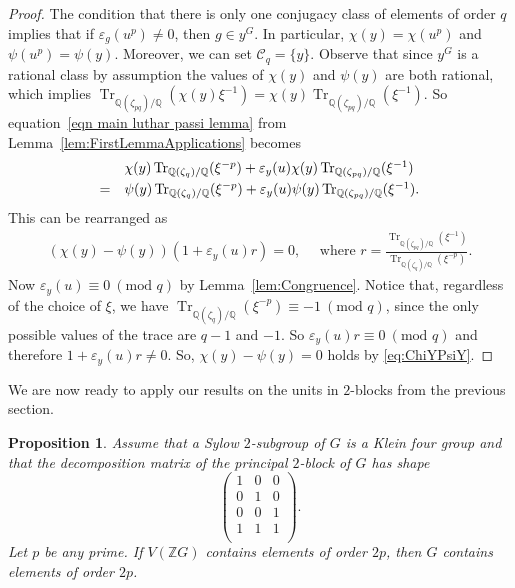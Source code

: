 \documentclass[11pt, a4paper]{amsart}
\newtheorem{proposition}[theorem]{Proposition}
\theoremstyle{definition}
\theoremstyle{definition}
\newcommand{\Tr}{\operatorname{Tr}}
\begin{document}
\begin{proof}
The condition that there is only one conjugacy class of elements of order $q$ implies that if $\varepsilon_g(u^p) \neq 0$, then $g \in y^G$. In particular, $\chi(y) = \chi(u^p)$ and $\psi(u^p) = \psi(y)$. Moreover, we can set $\mathcal{C}_q = \{y \}$. Observe that since $y^G$ is a rational class by assumption the values of $\chi(y)$ and $\psi(y)$ are both rational, which implies $\Tr_{\mathbb{Q}(\zeta_{pq})/\mathbb{Q}}(\chi(y)\xi^{-1})  = \chi(y) \Tr_{\mathbb{Q}(\zeta_{pq})/\mathbb{Q}}(\xi^{-1})$.
So equation~\eqref{eqn main luthar passi lemma}
 from Lemma~\ref{lem:FirstLemmaApplications} becomes
 \begin{equation}
 \begin{array}{rl}
 & \chi(y)\Tr_{\mathbb{Q}(\zeta_q)/\mathbb{Q}}(\xi^{-p}) + \varepsilon_y(u)\chi(y)\Tr_{\mathbb{Q}(\zeta_{pq})/\mathbb{Q}}(\xi^{-1}) \vspace*{.1cm} \\ 
 =& \psi(y)\Tr_{\mathbb{Q}(\zeta_q)/\mathbb{Q}}(\xi^{-p}) + \varepsilon_y(u)\psi(y)\Tr_{\mathbb{Q}(\zeta_{pq})/\mathbb{Q}}(\xi^{-1}) .
 \end{array} 
 \end{equation}
This can be rearranged as
\begin{align}\label{eq:ChiYPsiY}
(\chi(y) - \psi(y))(1 + \varepsilon_y(u)r) = 0,\quad  \textrm{ where } r = \frac{\Tr_{\mathbb{Q}(\zeta_{pq})/\mathbb{Q}}(\xi^{-1})}{\Tr_{\mathbb{Q}(\zeta_q)/\mathbb{Q}}(\xi^{-p})}.
\end{align}
Now $\varepsilon_y(u) \equiv 0 \ (\textrm{mod }q)$ by Lemma~\ref{lem:Congruence}. Notice that, regardless of the choice of $\xi$, we have $\Tr_{\mathbb{Q}(\zeta_q)/\mathbb{Q}}(\xi^{-p}) \equiv -1\ (\textrm{mod }q)$, since the only possible values of the trace are $q-1$ and $-1$. So $\varepsilon_y(u)r \equiv 0 \ (\textrm{mod }q)$ and therefore $1+\varepsilon_y(u)r \neq 0$. So, $\chi(y) - \psi(y) = 0$ holds by \eqref{eq:ChiYPsiY}.
\end{proof}

We are now ready to apply our results on the units in $2$-blocks from the previous section.

\begin{proposition}
Assume that a Sylow $2$-subgroup of $G$ is a Klein four group and that the decomposition matrix of the principal $2$-block of $G$ has shape
\[\begin{pmatrix} 1 & 0 & 0 \\ 0 & 1 & 0 \\ 0 & 0 & 1 \\ 1 & 1 & 1 \\  \end{pmatrix}. \]
Let $p$ be any prime. If $V(\mathbb{Z}G)$ contains elements of order $2p$, then $G$ contains elements of order $2p$.
\end{proposition}
\end{document}
